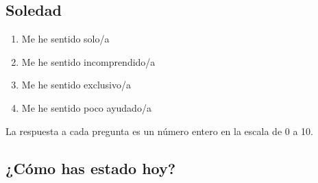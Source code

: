         \subsection{Soledad}
            \begin{enumerate}
                \item Me he sentido solo/a
                \item Me he sentido incomprendido/a
                \item Me he sentido exclusivo/a
                \item Me he sentido poco ayudado/a
            \end{enumerate}
            La respuesta a cada pregunta es un número entero en la escala de 0 a 10.

        \subsection{¿Cómo has estado hoy?}
